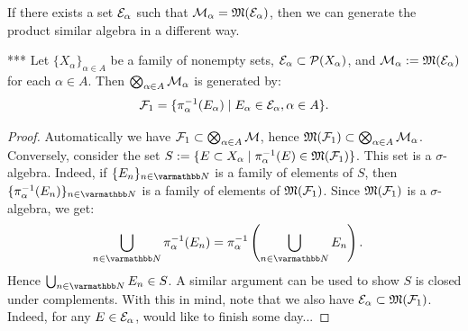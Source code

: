     If there exists a set $\mathcal{E}_\alpha$ such that $\mathcal{M}_\alpha = \mathfrak{M}(\mathcal{E}_\alpha)$, then we can generate the product similar algebra in a different way.

    \begin{lemma}***
        Let $\{X_\alpha\}_{\alpha \in A}$ be a family of nonempty sets, $\mathcal{E}_\alpha \subset \mathcal{P}(X_\alpha)$, and $\mathcal{M}_\alpha := \mathfrak{M}(\mathcal{E}_\alpha)$ for each $\alpha \in A$. Then $\bigotimes_{\alpha \in A}\mathcal{M}_\alpha$ is generated by:
            \begin{equation*}
            \begin{split}
                \mathcal{F}_1 = \{\pi_\alpha^{-1}(E_\alpha) \mid E_\alpha \in \mathcal{E}_\alpha, \alpha \in A\}.
            \end{split}
            \end{equation*}

    \end{lemma}
        \begin{proof}
            Automatically we have $\mathcal{F}_1 \subset \bigotimes_{\alpha \in A}\mathcal{M}$, hence $\mathfrak{M}(\mathcal{F}_1) \subset \bigotimes_{\alpha \in A}\mathcal{M}_\alpha$. Conversely, consider the set $S:=\{E \subset X_\alpha \mid \pi_\alpha^{-1}(E) \in \mathfrak{M}(\mathcal{F}_1)\}$. This set is a $\sigma$-algebra. Indeed, if $\{E_n\}_{n \in \bfN}$ is a family of elements of $S$, then $\{\pi_\alpha^{-1}(E_n)\}_{n \in \bfN}$ is a family of elements of $\mathfrak{M}(\mathcal{F}_1)$. Since $\mathfrak{M}(\mathcal{F}_1)$ is a $\sigma$-algebra, we get:
                \begin{equation*}
                \begin{split}
                    \bigcup_{n \in \bfN}\pi_\alpha^{-1}(E_n)
                    & = \pi_\alpha^{-1} \left( \bigcup_{n \in \bfN}E_n \right).
                \end{split}
                \end{equation*}
            Hence $\bigcup_{n \in \bfN}E_n \in S$. A similar argument can be used to show $S$ is closed under complements. With this in mind, note that we also have $\mathcal{E}_\alpha \subset \mathfrak{M}(\mathcal{F}_1)$. Indeed, for any $E \in \mathcal{E}_\alpha$, {\color{red} would like to finish some day...} 
        \end{proof}

